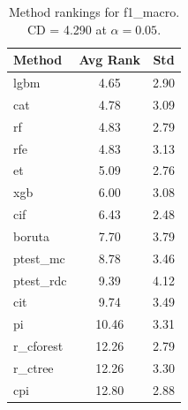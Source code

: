 \begin{table}[h]
\centering
\caption{Method rankings for f1_macro. CD = 4.290 at $\alpha=0.05$.}
\label{tab:ranks_f1_macro}
\begin{tabular}{lcc}
\toprule
Method & Avg Rank & Std \\
\midrule
lgbm & 4.65 & 2.90 \\
cat & 4.78 & 3.09 \\
rf & 4.83 & 2.79 \\
rfe & 4.83 & 3.13 \\
et & 5.09 & 2.76 \\
xgb & 6.00 & 3.08 \\
cif & 6.43 & 2.48 \\
boruta & 7.70 & 3.79 \\
ptest_mc & 8.78 & 3.46 \\
ptest_rdc & 9.39 & 4.12 \\
cit & 9.74 & 3.49 \\
pi & 10.46 & 3.31 \\
r_cforest & 12.26 & 2.79 \\
r_ctree & 12.26 & 3.30 \\
cpi & 12.80 & 2.88 \\
\bottomrule
\end{tabular}
\end{table}